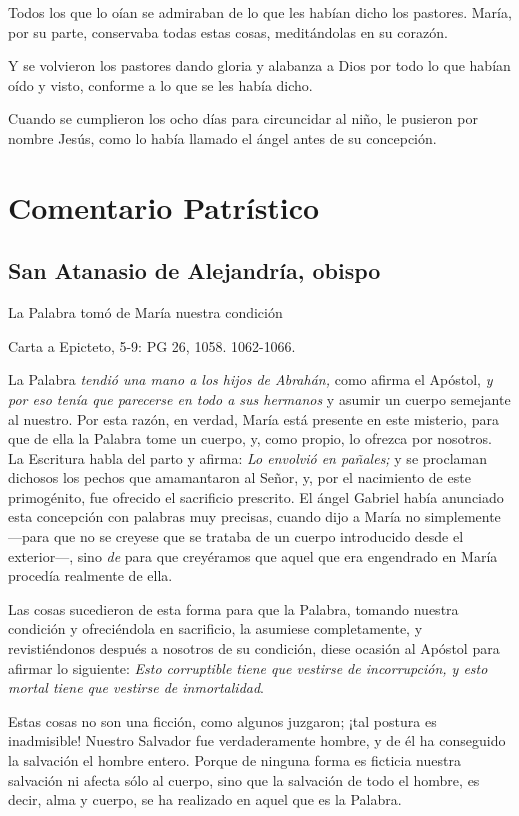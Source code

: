 Todos los que lo oían se admiraban de lo que les habían dicho los
pastores. María, por su parte, conservaba todas estas cosas,
meditándolas en su corazón.

Y se volvieron los pastores dando gloria y alabanza a Dios por todo lo
que habían oído y visto, conforme a lo que se les había dicho.

Cuando se cumplieron los ocho días para circuncidar al niño, le pusieron
por nombre Jesús, como lo había llamado el ángel antes de su concepción.


\section{Comentario Patrístico}

\subsection{San Atanasio de Alejandría, obispo}

La Palabra tomó de María nuestra condición

Carta a Epicteto, 5-9: PG 26, 1058. 1062-1066.

La Palabra \emph{tendió una mano a los hijos de Abrahán,} como afirma el Apóstol, \emph{y por eso tenía que parecerse en todo a sus hermanos} y asumir un cuerpo semejante al nuestro. Por esta razón, en verdad, María está presente en este misterio, para que de ella la Palabra tome un cuerpo, y, como propio, lo ofrezca por nosotros. La Escritura habla del parto y afirma: \emph{Lo envolvió en pañales;} y se proclaman dichosos los pechos que amamantaron al Señor, y, por el nacimiento de este primogénito, fue ofrecido el sacrificio prescrito. El ángel Gabriel había anunciado esta concepción con palabras muy precisas, cuando dijo a María no simplemente  ---para que no se creyese que se trataba de un cuerpo introducido desde el exterior---, sino \emph{de} para que creyéramos que aquel que era engendrado en María procedía realmente de ella.

Las cosas sucedieron de esta forma para que la Palabra, tomando nuestra condición y ofreciéndola en sacrificio, la asumiese completamente, y revistiéndonos después a nosotros de su condición, diese ocasión al Apóstol para afirmar lo siguiente: \emph{Esto corruptible tiene que vestirse de incorrupción, y esto mortal tiene que vestirse de inmortalidad}.

Estas cosas no son una ficción, como algunos juzgaron; ¡tal postura es inadmisible! Nuestro Salvador fue verdaderamente hombre, y de él ha conseguido la salvación el hombre entero. Porque de ninguna forma es ficticia nuestra salvación ni afecta sólo al cuerpo, sino que la salvación de todo el hombre, es decir, alma y cuerpo, se ha realizado en aquel que es la Palabra.

